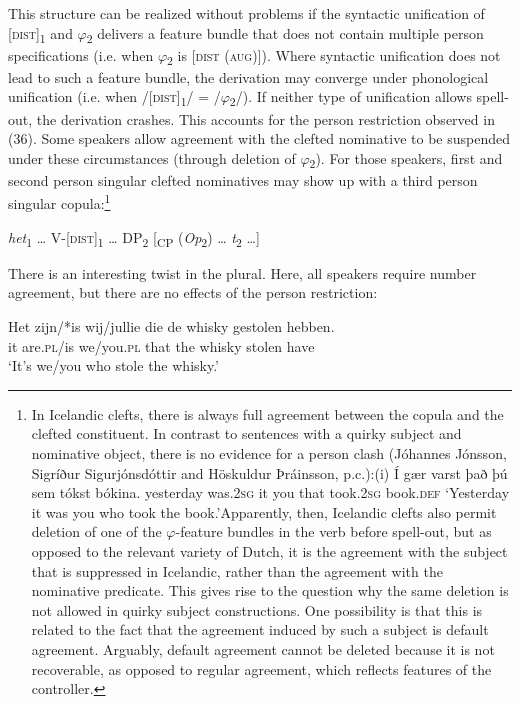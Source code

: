 \documentclass[output=paper]{langsci/langscibook}
\begin{document}
This structure can be realized without problems if the syntactic unification of [\textsc{dist}]\textsubscript{1} and $\varphi $\textsubscript{2} delivers a feature bundle that does not contain multiple person specifications (i.e. when $\varphi $\textsubscript{2} is [\textsc{dist} (\textsc{aug})]). Where syntactic unification does not lead to such a feature bundle, the derivation may converge under phonological unification (i.e. when /[\textsc{dist}]\textsubscript{1}/ = /$\varphi $\textsubscript{2}/). If neither type of unification allows spell-out, the derivation crashes. This accounts for the person restriction observed in (36). Some speakers allow agreement with the clefted nominative to be suspended under these circumstances (through deletion of $\varphi $\textsubscript{2}). For those speakers, first and second person singular clefted nominatives may show up with a third person singular copula:\footnote{In Icelandic clefts, there is always full agreement between the copula and the clefted constituent. In contrast to sentences with a quirky subject and nominative object, there is no evidence for a person clash (Jóhannes Jónsson, Sigríður Sigurjónsdóttir and Höskuldur Þráinsson, p.c.):(i)  Í gær        varst       það þú   sem tókst       bókina.  yesterday was.2\textsc{sg} it     you that took.2\textsc{sg} book.\textsc{def}  ‘Yesterday it was you who took the book.’Apparently, then, Icelandic clefts also permit deletion of one of the $\varphi $-feature bundles in the verb before spell-out, but as opposed to the relevant variety of Dutch, it is the agreement with the subject that is suppressed in Icelandic, rather than the agreement with the nominative predicate. This gives rise to the question why the same deletion is not allowed in quirky subject constructions. One possibility is that this is related to the fact that the agreement induced by such a subject is default agreement. Arguably, default agreement cannot be deleted because it is not recoverable, as opposed to regular agreement, which reflects features of the controller.}

\ea 
 \textit{het}\textsubscript{1} … V-[\textsc{dist}]\textsubscript{1} … DP\textsubscript{2} [\textsubscript{CP} (\textit{Op}\textsubscript{2}) … \textit{t}\textsubscript{2} …]
\z

There is an interesting twist in the plural. Here, all speakers require number agreement, but there are no effects of the person restriction:

\ea 
 \gll  Het zijn/*is   wij/jullie  die  de  whisky gestolen hebben.\\
      it    are.\textsc{pl}/is we/you.\textsc{pl} that the whisky stolen     have\\
 \glt    ‘It’s we/you who stole the whisky.’
\z
\end{document}
